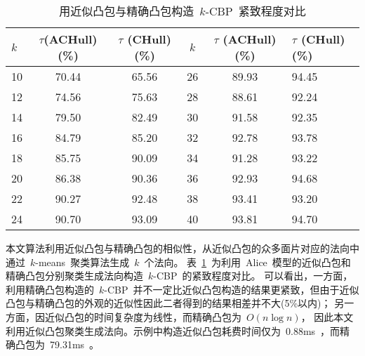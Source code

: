 \begin{table}[H]   
\centering
\caption{用近似凸包与精确凸包构造~$k$-CBP~紧致程度对比}
\label{tab:exp:ach:ch:tightness}
\begin{tabular}{lccccl}
\toprule[1.5pt]
$k$ &  $\tau$(ACHull)(\%) & $\tau$ (CHull)(\%)  & $k$ &  $\tau$ (ACHull)(\%) & $\tau$ (CHull)(\%) \\
\midrule[1.0pt]
10 &	70.44 & 	65.56     &26 &	89.93 & 	94.45 \\
12 &	74.56 & 	75.63     &28 &	88.61 & 	92.24 \\
14 &	79.50 & 	82.49     &30 &	91.58 & 	92.35 \\
16 &	84.79 & 	85.20     &32 &	92.78 & 	93.78 \\
18 &	85.75 & 	90.09     &34 &	91.28 & 	93.22 \\
20 &	86.38 & 	90.36     &36 &	92.93 & 	94.68 \\
22 &	90.27 & 	92.48     &38 &	93.41 & 	93.20 \\
24 &	90.70 & 	93.09     &40 &	93.81 & 	94.70 \\
\bottomrule[1.5pt]
\end{tabular}
\end{table}

本文算法利用近似凸包与精确凸包的相似性，从近似凸包的众多面片对应的法向中通过~$k$-means~聚类算法生成~$k$~个法向。
表~\ref{tab:exp:ach:ch:tightness}~为利用~Alice~模型的近似凸包和精确凸包分别聚类生成法向构造~$k$-CBP~的紧致程度对比。
可以看出，一方面，利用精确凸包构造的~$k$-CBP~并不一定比近似凸包构造的结果更紧致，但由于近似凸包与精确凸包的外观的近似性因此二者得到的结果相差并不大(5\%以内)；
另一方面，因近似凸包的时间复杂度为线性，而精确凸包为~$O(n\log n)$，
因此本文利用近似凸包聚类生成法向。示例中构造近似凸包耗费时间仅为~0.88ms~，而精确凸包为~79.31ms~。

